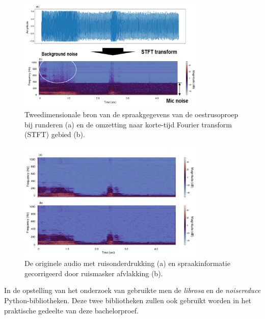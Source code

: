 \begin{figure}
    \centering
    \includegraphics[width=0.8\textwidth]{./img/conversion}
    \caption{\label{fig:conversion}Tweedimensionale bron van de spraakgegevens van de oestrusoproep bij runderen (a) en de omzetting naar korte-tijd Fourier transform (STFT) gebied (b).~\autocite{Jung2021}}
\end{figure}

\begin{figure}
    \centering
    \includegraphics[width=0.8\textwidth]{./img/The_original_noise-removed_audio}
    \caption{\label{fig:The_original_noise-removed_audio}De originele audio met ruisonderdrukking (a) en spraakinformatie gecorrigeerd door ruismasker afvlakking (b).~\autocite{Jung2021}}
\end{figure}

In de opstelling van het onderzoek van \textcite{Jung2021} gebruikte men de \textit{librosa} en de \textit{noisereduce} Python-bibliotheken. Deze twee bibliotheken zullen ook gebruikt worden in het praktische gedeelte van deze bachelorproef.
